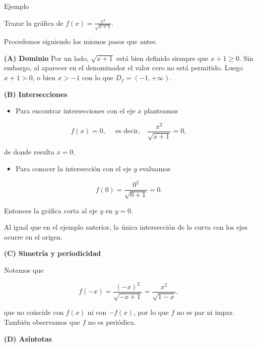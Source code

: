 \documentclass[
  letterpaper,
]{book}
\providecommand{\tightlist}{%
  \setlength{\itemsep}{0pt}\setlength{\parskip}{0pt}}
\theoremstyle{plain}
\theoremstyle{remark}
\begin{document}
Ejemplo

Trazar la gráfica de \(\displaystyle f(x)=\frac{x^2}{\sqrt{x+1}}\).

\begin{tcolorbox}[enhanced jigsaw, opacityback=0, left=2mm, opacitybacktitle=0.6, toprule=.15mm, bottomrule=.15mm, colbacktitle=quarto-callout-tip-color!10!white, titlerule=0mm, bottomtitle=1mm, title=\textcolor{quarto-callout-tip-color}{\faLightbulb}\hspace{0.5em}{Solución}, toptitle=1mm, colframe=quarto-callout-tip-color-frame, colback=white, breakable, rightrule=.15mm, arc=.35mm, leftrule=.75mm, coltitle=black]

Procedemos siguiendo los mismos pasos que antes.

\textbf{(A) Dominio} Por un lado, \(\sqrt{x+1}\) está bien definido
siempre que \(x+1\geq 0\). Sin embargo, al aparecer en el denominador el
valor cero no está permitido. Luego \(x+1>0\), o bien \(x>-1\) con lo
que \(D_f =(-1,+\infty)\).

\textbf{(B) Intersecciones}

\begin{itemize}
\tightlist
\item
  Para encontrar intersecciones con el eje \(x\) planteamos
\end{itemize}

\[
f(x)=0, \quad \text{ es decir,} \quad \frac{x^2}{\sqrt{x+1}}=0,
\]

de donde resulta \(x=0\).

\begin{itemize}
\tightlist
\item
  Para conocer la intersección con el eje \(y\) evaluamos
\end{itemize}

\[
f(0)=\frac{0^2}{\sqrt{0+1}}=0.
\]

Entonces la gráfica corta al eje \(y\) en \(y=0\).

Al igual que en el ejemplo anterior, la única intersección de la curva
con los ejes ocurre en el origen.

\textbf{(C) Simetría y periodicidad}

Notemos que

\[
f(-x)=\frac{(-x)^2}{\sqrt{-x+1}}=\frac{x^2}{\sqrt{1-x}},
\]

que no coincide con \(f(x)\) ni con \(-f(x)\), por lo que \(f\) no es
par ni impar. También observamos que \(f\) no es periódica.

\textbf{(D) Asíntotas}


\end{tcolorbox}
\end{document}
